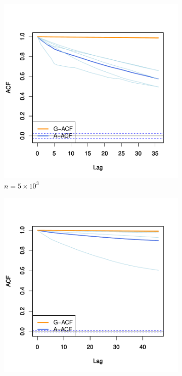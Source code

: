 \documentclass[11pt]{article}
\theoremstyle{remark}
\begin{document}
 \begin{figure}[h]
     \centering
     \begin{subfigure}[h]{.4\textwidth}
       \centering
       \includegraphics[width = \textwidth]{plots/sensor-acf_n5e3.pdf}
       \caption{$n = 5 \times 10^3$}
       \label{subfig:sensor-acf_n5e3}
     \end{subfigure}
     \begin{subfigure}[h]{.4\textwidth}
       \centering
       \includegraphics[width = \textwidth]{plots/sensor-acf_n5e4.pdf}

\end{subfigure}
\end{figure}
\end{document}
